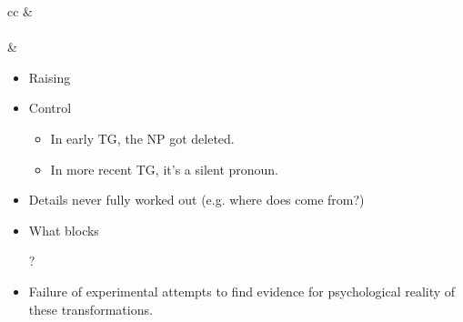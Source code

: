 \documentclass[a4paper,landscape,headrule,footrule]{foils}
\begin{document}
\bigskip

\begin{center}
\begin{tabular}{cc}
  & 
   \\
  \\[2ex]
   & 
\end{tabular}
\end{center}





\begin{itemize}
\item Raising
  \begin{exe}
    \ex    {}
    
     \ncbar[offsetB=4pt,angleA=-90,nodesep=3pt]{<-}{A}{B}
  \end{exe}
\item Control
  \begin{exe}
    \ex {}
  \end{exe}
  \begin{itemize}
  \item In early TG, the NP got deleted.
  \item In more recent TG, it’s a silent pronoun.
  \end{itemize}
\end{itemize}



\begin{itemize}
\item Details never fully worked out (e.g. where does 
come from?)

\item What blocks 
  \begin{xlisti}
    \ex *
    \ex *?

  \end{xlisti}

\item Failure of experimental attempts to find evidence for 
psychological reality of these transformations.
\end{itemize}
\end{document}
